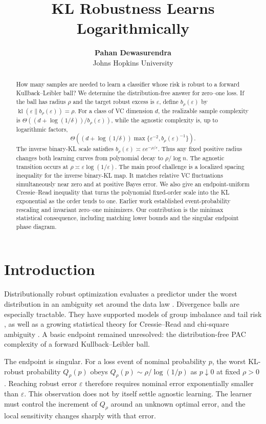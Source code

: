 \documentclass{article}
\title{KL Robustness Learns Logarithmically}
\author{\textbf{Pahan Dewasurendra} \\ Johns Hopkins University}
\theoremstyle{remark}
\newcommand{\kl}{\operatorname{kl}}
\newcommand{\eps}{\varepsilon}
\begin{document}
\maketitle

\begin{abstract}
How many samples are needed to learn a classifier whose risk is robust to a forward Kullback--Leibler ball?  We determine the distribution-free answer for zero--one loss.  If the ball has radius $\rho$ and the target robust excess is $\eps$, define $b_\rho(\eps)$ by $\kl(\eps\|b_\rho(\eps))=\rho$.  For a class of VC dimension $d$, the realizable sample complexity is $\Theta((d+\log(1/\delta))/b_\rho(\eps))$, while the agnostic complexity is, up to logarithmic factors, \[ \Theta\!\left((d+\log(1/\delta)) \max\{\eps^{-2},b_\rho(\eps)^{-1}\}\right). \] The inverse binary-KL scale satisfies $b_\rho(\eps)\asymp\eps e^{-\rho/\eps}$.  Thus any fixed positive radius changes both learning curves from polynomial decay to $\rho/\log n$.  The agnostic transition occurs at $\rho\asymp\eps\log(1/\eps)$.  The main proof challenge is a localized spacing inequality for the inverse binary-KL map.  It matches relative VC fluctuations simultaneously near zero and at positive Bayes error.  We also give an endpoint-uniform Cressie--Read inequality that turns the polynomial fixed-order scale into the KL exponential as the order tends to one.  Earlier work established event-probability rescaling and invariant zero--one minimizers.  Our contribution is the minimax statistical consequence, including matching lower bounds and the singular endpoint phase diagram.
\end{abstract}

\section{Introduction}

Distributionally robust optimization evaluates a predictor under the worst distribution in an ambiguity set around the data law \citep{bental2013robust,duchi2021uniform}.  Divergence balls are especially tractable.  They have supported models of group imbalance and tail risk \citep{hashimoto2018fairness}, as well as a growing statistical theory for Cressie--Read and chi-square ambiguity \citep{zhou2023chisquare,zhou2026rademacher,aignerhorev2026cressie}.  A basic endpoint remained unresolved: the distribution-free PAC complexity of a forward Kullback--Leibler ball.

The endpoint is singular.  For a loss event of nominal probability $p$, the worst KL-robust probability $Q_\rho(p)$ obeys $Q_\rho(p)\sim\rho/\log(1/p)$ as $p\downarrow0$ at fixed $\rho>0$ \citep{aignerhorev2026cressie}.  Reaching robust error $\eps$ therefore requires nominal error exponentially smaller than $\eps$.  This observation does not by itself settle agnostic learning.  The learner must control the increment of $Q_\rho$ around an unknown optimal error, and the local sensitivity changes sharply with that error.
\end{document}
